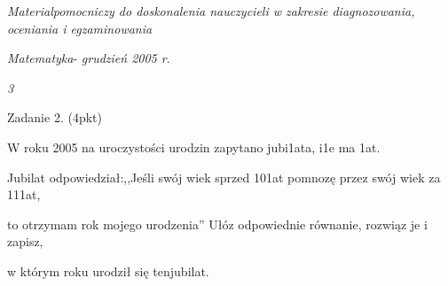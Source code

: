 \documentclass[a4paper,12pt]{article}
\begin{document}
{\it Materialpomocniczy do doskonalenia nauczycieli w zakresie diagnozowania, oceniania i egzaminowania}

{\it Matematyka}- {\it grudzień 2005 r}.

{\it 3}

Zadanie 2. (4pkt)

W roku 2005 na uroczystości urodzin zapytano jubi1ata, i1e ma 1at.

Jubilat odpowiedział:,,Jeśli swój wiek sprzed 101at pomnozę przez swój wiek za 111at,

to otrzymam rok mojego urodzenia'' Ułóz odpowiednie równanie, rozwiąz je i zapisz,

w którym roku urodził się tenjubilat.
\end{document}
